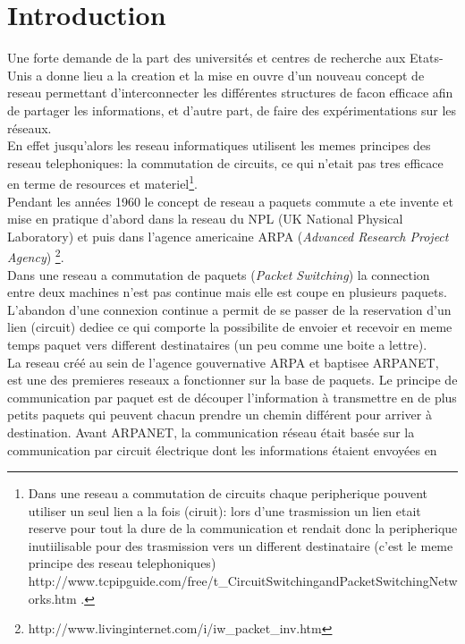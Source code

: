 \section{Introduction}
\label{sec:intro}


Une forte demande de la part des universités et centres de recherche aux
Etats-Unis a donne lieu a la creation et la mise en ouvre d'un nouveau concept
de reseau permettant d'interconnecter les différentes structures de facon
efficace afin de partager les informations, et d'autre part, de faire des
expérimentations sur les réseaux.
\\
En effet jusqu'alors les reseau informatiques utilisent les memes principes des
reseau telephoniques: la commutation de circuits, ce qui n'etait pas tres 
efficace en terme de resources et materiel\footnote {
Dans une reseau a commutation de circuits chaque peripherique pouvent utiliser
un seul lien a la fois (ciruit): lors d'une trasmission  un lien etait reserve
pour tout la dure de la communication et rendait donc la peripherique
inutiilisable pour des trasmission vers un different destinataire (c'est le meme
principe des reseau telephoniques)
http://www.tcpipguide.com/free/t\_CircuitSwitchingandPacketSwitchingNetworks.htm .}.
\\
Pendant les années 1960 le concept de reseau a paquets commute a ete invente et mise en 
pratique d'abord dans la reseau du NPL (UK National Physical Laboratory) et
puis dans l'agence americaine ARPA ({\it Advanced Research Project Agency})
\footnote {http://www.livinginternet.com/i/iw\_packet\_inv.htm}.
\\
Dans une reseau a commutation de paquets ({\it Packet Switching}) la connection
entre deux machines n'est pas continue mais elle est coupe en plusieurs
paquets.  L'abandon d'une connexion continue a permit de se passer de la
reservation d'un lien (circuit) dediee ce qui comporte la possibilite de
envoier et recevoir en meme temps paquet vers different destinataires (un peu
comme une boite a lettre). 
\\
La reseau créé au sein de l'agence gouvernative ARPA et baptisee ARPANET, est une
des premieres reseaux a fonctionner sur la base de paquets. Le principe de
communication par paquet est de découper l'information à transmettre en de plus
petits paquets qui peuvent chacun prendre un chemin différent pour arriver à
destination.  Avant ARPANET, la communication réseau était basée sur la
communication par circuit électrique dont les informations étaient envoyées en
